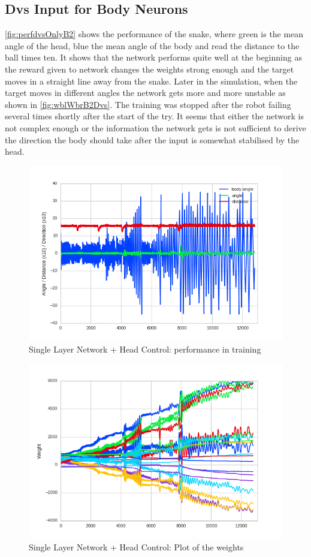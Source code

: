 \subsection{Dvs Input for Body Neurons}
\autoref{fig:perfdvsOnlyB2} shows the performance of the snake, where green is the mean angle of the head, blue the mean angle of the body and read the distance to the ball times ten. It shows that the network performs quite well at the beginning as the reward given to network changes the weights strong enough and the target moves in a straight line away from the snake. Later in the simulation, when the target moves in different angles the network gets more and more unstable as shown in \autoref{fig:wblWbrB2Dvs}. The training was stopped after the robot failing several times shortly after the start of the try. It seems that either the network is not complex enough or the information the network gets is not sufficient to derive the direction the body should take after the input is somewhat stabilised by the head.
\begin{figure}[htpb]
  \centering
  \includegraphics[scale=0.77]{figures/plots/newPlots/base2_perf}%
  \caption{ Single Layer Network + Head Control: performance in training }
  \label{fig:perfdvsOnlyB2}
\end{figure}
\begin{figure}[htpb]
  \centering
  \includegraphics[scale=0.77]{figures/plots/newPlots/base2_weights}%
  \caption{ Single Layer Network + Head Control: Plot of the weights }
  \label{fig:wblWbrB2Dvs}
\end{figure}
